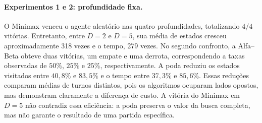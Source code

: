 \documentclass[letterpaper]{article} %
\begin{document}
\begin{table}[t]
\centering
\caption{Resultados com profundidade fixa. Em cada linha, $A/B$ segue a ordem do confronto; $n$ é o número de decisões e $C_A$ são os cortes do primeiro algoritmo.}
\label{tab:fixed-depth}
\scriptsize
{}
\end{table}

\paragraph{Experimentos 1 e 2: profundidade fixa.}
O Minimax venceu o agente aleatório nas quatro profundidades, totalizando $4/4$ vitórias. Entretanto, entre $D=2$ e $D=5$, sua média de estados cresceu aproximadamente 318 vezes e o tempo, 279 vezes. No segundo confronto, a Alfa--Beta obteve duas vitórias, um empate e uma derrota, correspondendo a taxas observadas de $50\%$, $25\%$ e $25\%$, respectivamente. A poda reduziu os estados visitados entre $40,8\%$ e $83,5\%$ e o tempo entre $37,3\%$ e $85,6\%$. Essas reduções comparam médias de turnos distintos, pois os algoritmos ocuparam lados opostos, mas demonstram claramente a diferença de custo. A vitória do Minimax em $D=5$ não contradiz essa eficiência: a poda preserva o valor da busca completa, mas não garante o resultado de uma partida específica.
\end{document}
